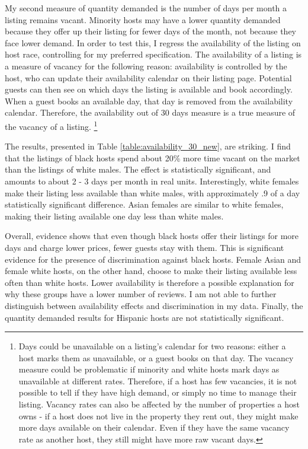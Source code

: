My second measure of quantity demanded is the number of days per month a listing remains vacant. Minority hosts may have a lower quantity demanded because they offer up their listing for fewer days of the month, not because they face lower demand. In order to test this, I regress the availability of the listing on host race, controlling for my preferred specification. The availability of a listing is a measure of vacancy for the following reason: availability is controlled by the host, who can update their availability calendar on their listing page. Potential guests can then see on which days the listing is available and book accordingly. When a guest books an available day, that day is removed from the availability calendar. Therefore, the availability out of 30 days measure is a true measure of the vacancy of a listing.%
	\footnote{Days could be unavailable on a listing's calendar for two reasons: either a host marks them as unavailable, or a guest books on that day. The vacancy measure could be problematic if minority and white hosts mark days as unavailable at different rates. Therefore, if a host has few vacancies, it is not possible to tell if they have high demand, or simply no time to manage their listing. Vacancy rates can also be affected by the number of properties a host owns - if a host does not live in the property they rent out, they might make more days available on their calendar. Even if they have the same vacancy rate as another host, they still might have more raw vacant days.}

The results, presented in Table \ref{table:availability_30_new}, are striking. I find that the listings of black hosts spend about 20\% more time vacant on the market than the listings of white males. The effect is statistically significant, and amounts to about 2 - 3 days per month in real units. Interestingly, white females make their listing less available than white males, with approximately .9 of a day statistically significant difference. Asian females are similar to white females, making their listing available one day less than white males. 

Overall, evidence shows that even though black hosts offer their listings for more days and charge lower prices, fewer guests stay with them. This is significant evidence for the presence of discrimination against black hosts. Female Asian and female white hosts, on the other hand, choose to make their listing available less often than white hosts. Lower availability is therefore a possible explanation for why these groups have a lower number of reviews. I am not able to further distinguish between availability effects and discrimination in my data. Finally, the quantity demanded results for Hispanic hosts are not statistically significant. 















